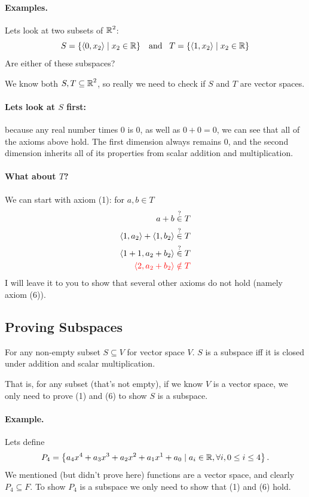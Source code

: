\paragraph{Examples.} 
Lets look at two subsets of $\operatorname{\mathbb{R}}^2$:
\[S = \left\{\left\langle 0, x_2\right\rangle \mid x_2 \in \operatorname{\mathbb{R}}\right\} \;\;\;\textnormal{and}\;\;\;
T = \left\{\left\langle 1, x_2\right\rangle \mid x_2 \in \operatorname{\mathbb{R}}\right\}\]
Are either of these subspaces? 

We know both $S, T \subseteq \operatorname{\mathbb{R}}^2$, so really we need to check if $S$ and $T$ are vector spaces. 

\paragraph{Lets look at $S$ first: }
because any real number times 0 is 0, as well as $0+0=0$, we can see that all of the axioms above hold. 
The first dimension always remains $0$, and the second dimension inherits all of its properties from scalar addition and multiplication. 

\paragraph{What about $T$? }
We can start with axiom (1): 
for $a,b \in T$
\[\begin{aligned}
a + b & \stackrel{?}{\in}  T\\
\langle 1,a_2\rangle + \langle 1, b_2\rangle & \stackrel{?}{\in}  T\\
\langle 1+1,a_2+b_2\rangle & \stackrel{?}{\in}  T\\
\color{red} \langle 2,a_2+b_2\rangle& \color{red}\notin T\\
\end{aligned}\]
I will leave it to you to show that several other axioms do not hold (namely axiom (6)). 

\subsection{Proving Subspaces}
For any non-empty subset $S\subseteq V$ for vector space $V$. 
$S$ is a subspace iff it is closed under addition and scalar multiplication. 

That is, for any subset (that's not empty), if we know $V$ is a vector space, we only need to prove (1) and (6) to show $S$ is a subspace. 

\paragraph{Example.}
Lets define \[P_4 = \left\{a_4x^4 + a_3x^3 + a_2x^2 + a_1x^1 + a_0 \mid a_i\in \operatorname{\mathbb{R}}, \forall i, 0 \le i \le 4 \right\}.\]
We mentioned (but didn't prove here) functions are a vector space, and clearly $P_4 \subseteq F$. 
To show $P_4$ is a subspace we only need to show that (1) and (6) hold. 

